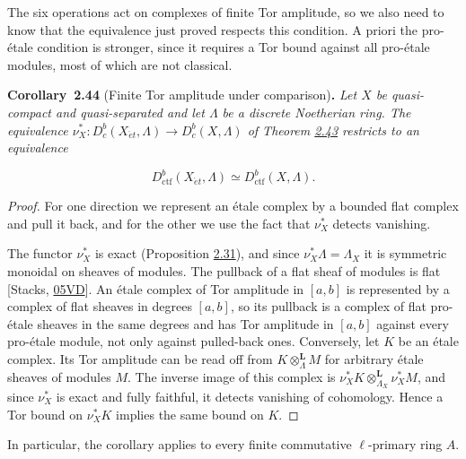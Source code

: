 \documentclass[11pt]{article}
\newenvironment{bpstatement}[2]{\par\addvspace{0.6\baselineskip}\noindent\textbf{#1}#2\textbf{.}\enspace\ignorespaces}
  {\par\addvspace{0.4\baselineskip}}
\newenvironment{bpstatementit}[2]{\begin{bpstatement}{#1}{#2}\itshape\ignorespaces}{\end{bpstatement}}
\providecommand{\Dbc}{}\renewcommand{\Dbc}{D^b_c}
\begin{document}
\label{bp129}%
The six operations act on complexes of finite Tor amplitude, so we also need to know that the equivalence just proved respects this condition. A priori the pro-étale condition is stronger, since it requires a Tor bound against all pro-étale modules, most of which are not classical.

\label{bp130}%
\begin{bpstatementit}{Corollary~2.44}{ (Finite Tor amplitude under comparison)}
Let \(X\) be quasi-compact and quasi-separated and let \(\Lambda\) be a discrete Noetherian ring. The equivalence \(\nu_X^*:D^b_c(X_{\acute{e}t},\Lambda)\to\Dbc(X,\Lambda)\) of Theorem \hyperref[bp127]{2.43} restricts to an equivalence

\[
D^b_{\mathrm{ctf}}(X_{\acute{e}t},\Lambda)\simeq D^b_{\mathrm{ctf}}(X,\Lambda).
\]
\end{bpstatementit}

\begin{proof}[{Proof}]\label{bp131}%
For one direction we represent an étale complex by a bounded flat complex and pull it back, and for the other we use the fact that \(\nu_X^*\) detects vanishing.

The functor \(\nu_X^*\) is exact (Proposition \hyperref[bp90]{2.31}), and since \(\nu_X^*\Lambda=\Lambda_X\) it is symmetric monoidal on sheaves of modules. The pullback of a flat sheaf of modules is flat [Stacks, \href{https://stacks.math.columbia.edu/tag/05VD}{05VD}]. An étale complex of Tor amplitude in \([a,b]\) is represented by a complex of flat sheaves in degrees \([a,b]\), so its pullback is a complex of flat pro-étale sheaves in the same degrees and has Tor amplitude in \([a,b]\) against every pro-étale module, not only against pulled-back ones. Conversely, let \(K\) be an étale complex. Its Tor amplitude can be read off from \(K\otimes^{\mathbf L}_\Lambda M\) for arbitrary étale sheaves of modules \(M\). The inverse image of this complex is \(\nu_X^*K\otimes^{\mathbf L}_{\Lambda_X}\nu_X^*M\), and since \(\nu_X^*\) is exact and fully faithful, it detects vanishing of cohomology. Hence a Tor bound on \(\nu_X^*K\) implies the same bound on \(K\).
\end{proof}

\label{bp132}%
In particular, the corollary applies to every finite commutative \(\ell\)-primary ring \(A\).
\end{document}
